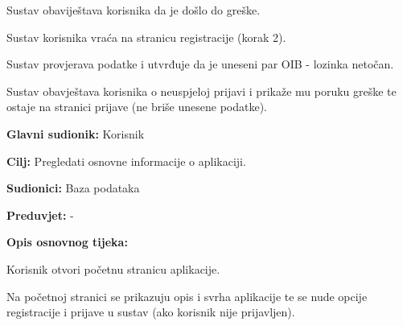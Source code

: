 \begin{packed_item}
\begin{packed_item}
\begin{packed_enum}
								\item Sustav obaviještava korisnika da je došlo do greške.
								\item Sustav korisnika vraća na stranicu registracije (korak 2).
							\end{packed_enum}
							
							\item[5.a] Sustav provjerava podatke i utvrđuje da je uneseni par OIB - lozinka netočan.
							\item[] \begin{packed_enum}
								
								\item Sustav obavještava korisnika o neuspjeloj prijavi i prikaže mu poruku greške te ostaje na stranici prijave (ne briše unesene podatke).
								
								
							\end{packed_enum}
							
						\end{packed_item}
					\end{packed_item}
					
					\noindent {}
					\begin{packed_item}
						
						\item \textbf{Glavni sudionik: }Korisnik
						\item  \textbf{Cilj:} Pregledati osnovne informacije o aplikaciji.
						\item  \textbf{Sudionici:} Baza podataka
						\item  \textbf{Preduvjet:} -
						\item  \textbf{Opis osnovnog tijeka:}
						
						\item[] \begin{packed_enum}
							
							\item Korisnik otvori početnu stranicu aplikacije.
							\item Na početnoj stranici se prikazuju opis i svrha aplikacije te se nude opcije registracije i prijave u sustav (ako korisnik nije prijavljen).
						\end{packed_enum}
						
					
					\end{packed_item}
					
